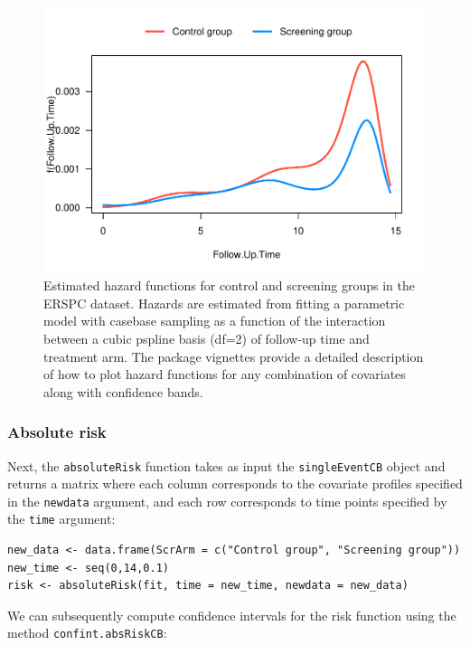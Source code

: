 \begin{figure}[ht]
\includegraphics[width=\textwidth,keepaspectratio=true]{./cs1hazard-1} \caption{Estimated hazard functions for control and screening groups in the ERSPC dataset. Hazards are estimated from fitting a parametric model with casebase sampling as a function of the interaction between a cubic pspline basis (df=2) of follow-up time and treatment arm. The package vignettes provide a detailed description of how to plot hazard functions for any combination of covariates along with confidence bands.}\label{fig:cs1hazard}
\end{figure}

\hypertarget{absolute-risk}{%
\subsubsection{Absolute risk}\label{absolute-risk}}

Next, the \texttt{absoluteRisk} function takes as input the \texttt{singleEventCB} object and returns a matrix where each column corresponds to the covariate profiles specified in the \texttt{newdata} argument, and each row corresponds to time points specified by the \texttt{time} argument:

\begin{verbatim}
new_data <- data.frame(ScrArm = c("Control group", "Screening group"))
new_time <- seq(0,14,0.1)
risk <- absoluteRisk(fit, time = new_time, newdata = new_data)
\end{verbatim}

We can subsequently compute confidence intervals for the risk function using
the method \texttt{confint.absRiskCB}:

